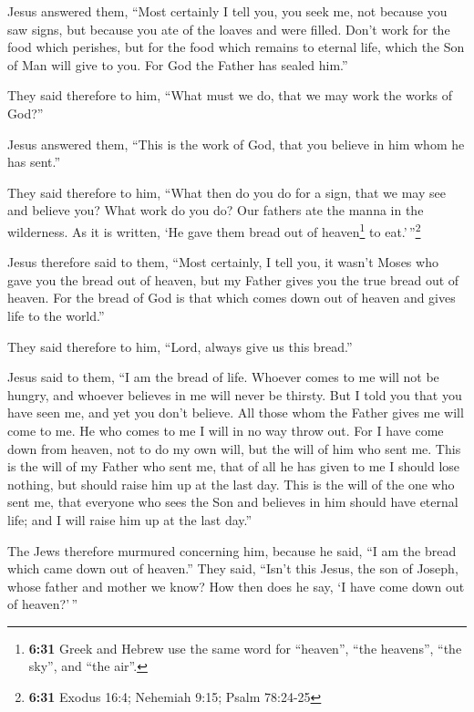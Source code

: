  Jesus answered them, ``Most certainly I tell you, you
seek me, not because you saw signs, but because you ate of the loaves
and were filled.  Don't work for the food which perishes,
but for the food which remains to eternal life, which the Son of Man
will give to you. For God the Father has sealed him.''

 They said therefore to him, ``What must we do, that we
may work the works of God?''

 Jesus answered them, ``This is the work of God, that you
believe in him whom he has sent.''

 They said therefore to him, ``What then do you do for a
sign, that we may see and believe you? What work do you do?
 Our fathers ate the manna in the wilderness. As it is
written, `He gave them bread out of heaven\footnote{\textbf{6:31} Greek
  and Hebrew use the same word for ``heaven'', ``the heavens'', ``the
  sky'', and ``the air''.} to eat.'\,''\footnote{\textbf{6:31} Exodus
  16:4; Nehemiah 9:15; Psalm 78:24-25}

 Jesus therefore said to them, ``Most certainly, I tell
you, it wasn't Moses who gave you the bread out of heaven, but my Father
gives you the true bread out of heaven.  For the bread of
God is that which comes down out of heaven and gives life to the
world.''

 They said therefore to him, ``Lord, always give us this
bread.''

 Jesus said to them, ``I am the bread of life. Whoever
comes to me will not be hungry, and whoever believes in me will never be
thirsty.  But I told you that you have seen me, and yet
you don't believe.  All those whom the Father gives me
will come to me. He who comes to me I will in no way throw out.
 For I have come down from heaven, not to do my own will,
but the will of him who sent me.  This is the will of my
Father who sent me, that of all he has given to me I should lose
nothing, but should raise him up at the last day.  This
is the will of the one who sent me, that everyone who sees the Son and
believes in him should have eternal life; and I will raise him up at the
last day.''

 The Jews therefore murmured concerning him, because he
said, ``I am the bread which came down out of heaven.'' 
They said, ``Isn't this Jesus, the son of Joseph, whose father and
mother we know? How then does he say, `I have come down out of
heaven?'\,''

